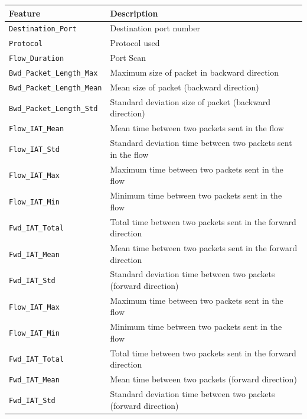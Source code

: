 \begin{table}[h!]
    \centering
    \begin{tabular}{l|l}
        \toprule 
        Feature & Description \\
        \midrule
        \rowcolor{black!10} \texttt{Destination\_Port} & Destination port number  \\
        \texttt{Protocol} & Protocol used \\
        \rowcolor{black!10} \texttt{Flow\_Duration} & Port Scan \\
        \texttt{Bwd\_Packet\_Length\_Max} & Maximum size of packet in backward direction \\
        \rowcolor{black!10} \texttt{Bwd\_Packet\_Length\_Mean} & Mean size of packet (backward direction) \\
        \texttt{Bwd\_Packet\_Length\_Std} & Standard deviation size of packet (backward direction) \\
        \rowcolor{black!10} \texttt{Flow\_IAT\_Mean} & Mean time between two packets sent in the flow \\
        \texttt{Flow\_IAT\_Std} & Standard deviation time between two packets sent in the flow \\
        \rowcolor{black!10} \texttt{Flow\_IAT\_Max} & Maximum time between two packets sent in the flow \\
        \texttt{Flow\_IAT\_Min} & Minimum time between two packets sent in the flow \\
        \rowcolor{black!10} \texttt{Fwd\_IAT\_Total} & Total time between two packets sent in the forward direction \\
        \texttt{Fwd\_IAT\_Mean} & Mean time between two packets sent in the forward direction \\
        \rowcolor{black!10} \texttt{Fwd\_IAT\_Std} & Standard deviation time between two packets (forward direction) \\
        \texttt{Flow\_IAT\_Max} & Maximum time between two packets sent in the flow \\
        \rowcolor{black!10} \texttt{Flow\_IAT\_Min} & Minimum time between two packets sent in the flow \\
        \texttt{Fwd\_IAT\_Total} & Total time between two packets sent in the forward direction \\
        \rowcolor{black!10} \texttt{Fwd\_IAT\_Mean} & Mean time between two packets (forward direction) \\
        \texttt{Fwd\_IAT\_Std} & Standard deviation time between two packets (forward direction) \\

\end{tabular}
\end{table}

